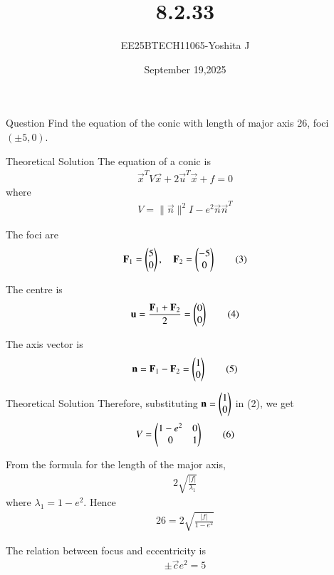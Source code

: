 \documentclass{beamer}
\begin{document}
\title 
{8.2.33}
\date{September 19,2025}

\author 
{EE25BTECH11065-Yoshita J}

\frame{\titlepage}
\begin{frame}{Question}
Find the equation of the conic with length of major axis 26, foci $(\pm 5, 0)$.
\end{frame}

\begin{frame}{Theoretical Solution}
The equation of a conic is
\begin{align}
\vec{x}^T V \vec{x} + 2\vec{u}^T \vec{x} + f = 0 \tag{1}
\end{align}
where
\begin{align}
V = \|\vec{n}\|^2 I - e^2\vec{n}\vec{n}^T \tag{2}
\end{align}

The foci are
\begin{align}
\mathbf{F}_1 = \begin{pmatrix}5\\0\end{pmatrix},\quad \mathbf{F}_2 = \begin{pmatrix}-5\\0\end{pmatrix} \tag{3}
\end{align}

The centre is
\begin{align}
\mathbf{u} = \frac{\mathbf{F}_1+\mathbf{F}_2}{2} = \begin{pmatrix}0\\0\end{pmatrix} \tag{4}
\end{align}

The axis vector is
\begin{align}
\mathbf{n} = \mathbf{F}_1-\mathbf{F}_2 = \begin{pmatrix}1\\0\end{pmatrix} \tag{5}
\end{align}
\end{frame}

\begin{frame}{Theoretical Solution}
Therefore, substituting $\mathbf{n}=\begin{pmatrix}1\\0\end{pmatrix}$ in (2), we get
\begin{align}
V = \begin{pmatrix}1-e^2 & 0 \\ 0 & 1\end{pmatrix} \tag{6}
\end{align}

From the formula for the length of the major axis,
\begin{align}
2\sqrt{\frac{|f|}{\lambda_1}} \tag{7}
\end{align}
where $\lambda_1 = 1-e^2$. Hence
\begin{align}
26 = 2\sqrt{\frac{|f|}{1-e^2}} \tag{8}
\end{align}

The relation between focus and eccentricity is
\begin{align}
\pm \vec{c}e^2 = 5 \tag{9}
\end{align}
\end{frame}
\end{document}
